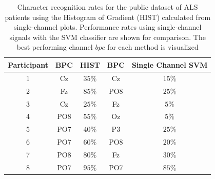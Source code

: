 \documentclass[utf8]{frontiersSCNS} %
\begin{document}
%
%



\begin{table}[htb]
\caption{Character recognition rates for the public dataset of ALS patients using the Histogram of Gradient (HIST) calculated from  single-channel plots.  Performance rates using single-channel signals with the SVM classifier are shown for comparison.  The best performing channel $bpc$ for each method is visualized}
\centering
\begin{tabular}{c|cc|cc}
\toprule
\textbf{Participant}	&  \textbf{BPC}	&  HIST &  \textbf{BPC}	&  Single Channel SVM \\
\midrule
1     &     Cz   &   $35\%$    &  Cz   & $15\%$   \\
2     &     Fz   &   $85\%$      &  PO8   & $25\%$   \\
3     &     Cz   &   $25\%$    &  Fz   & $5\%$   \\
4     &     PO8 &   $55\%$   &  Oz   & $5\%$    \\
5     &     PO7 &   $40\%$    &  P3   & $25\%$   \\
6     &     PO7 &   $60\%$  &  PO8   & $20\%$    \\
7     &     PO8 &   $80\%$   &  Fz   & $30\%$     \\
8     &     PO7 &   $95\%$     &  PO7   & $85\%$ \\

\end{tabular}
\label{tab:resultsals}
\end{table}
\end{document}
